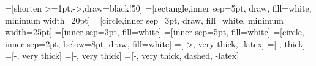 \renewcommand{\.}{. \;}
\theoremstyle{definition}
\newtheorem*{definition}{Definition}
\newtheorem*{example}{Example}

\theoremstyle{plain}
\newtheorem{theorem}{Theorem}

\theoremstyle{remark}
\newtheorem*{remark}{Remark}

\newcommand{\ket}[1]{\lvert #1 \rangle}
\newcommand{\vc}[2]{\begin{pmatrix}#1\\#2\end{pmatrix}}
\newcommand{\vcc}[4]{\begin{pmatrix}#1\\#2\\#3\\#4\end{pmatrix}}
\newcommand{\op}[1]{\operatorname{#1}\;}
\newcommand{\oper}[2]{\begin{pmatrix}#1\\#2\end{pmatrix}}

\newcommand{\oort}{\frac{1}{\sqrt{2}}}



=[shorten >=1pt,->,draw=black!50]
=[rectangle,inner sep=5pt, draw, fill=white, minimum width=20pt]
=[circle,inner sep=3pt, draw, fill=white, minimum width=25pt]
=[inner sep=3pt, fill=white]
=[inner sep=5pt, fill=white]
=[circle, inner sep=2pt, below=8pt, draw, fill=white]
=[->, very thick, -latex]
=[-, thick]
=[-, very thick]
=[-, very thick]
=[-, very thick, dashed, -latex]
